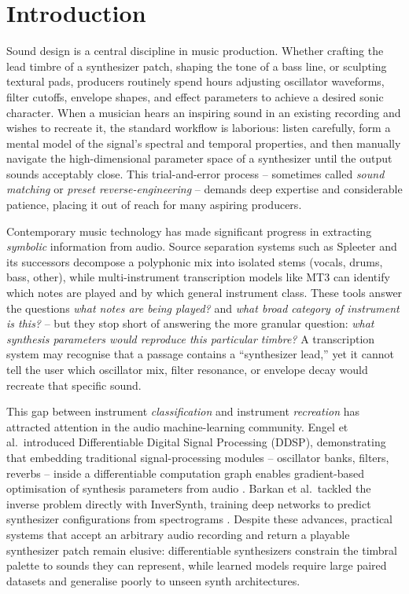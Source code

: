\section{Introduction}

Sound design is a central discipline in music production. Whether crafting the lead timbre of a synthesizer patch, shaping the tone of a bass line, or sculpting textural pads, producers routinely spend hours adjusting oscillator waveforms, filter cutoffs, envelope shapes, and effect parameters to achieve a desired sonic character. When a musician hears an inspiring sound in an existing recording and wishes to recreate it, the standard workflow is laborious: listen carefully, form a mental model of the signal's spectral and temporal properties, and then manually navigate the high-dimensional parameter space of a synthesizer until the output sounds acceptably close. This trial-and-error process -- sometimes called \emph{sound matching} or \emph{preset reverse-engineering} -- demands deep expertise and considerable patience, placing it out of reach for many aspiring producers.

Contemporary music technology has made significant progress in extracting \emph{symbolic} information from audio. Source separation systems such as Spleeter \citep{hennequin2020spleeter} and its successors decompose a polyphonic mix into isolated stems (vocals, drums, bass, other), while multi-instrument transcription models like MT3 \citep{gardner2022mt3} can identify which notes are played and by which general instrument class. These tools answer the questions \emph{what notes are being played?} and \emph{what broad category of instrument is this?} -- but they stop short of answering the more granular question: \emph{what synthesis parameters would reproduce this particular timbre?} A transcription system may recognise that a passage contains a ``synthesizer lead,'' yet it cannot tell the user which oscillator mix, filter resonance, or envelope decay would recreate that specific sound.

This gap between instrument \emph{classification} and instrument \emph{recreation} has attracted attention in the audio machine-learning community. Engel et al.\ introduced Differentiable Digital Signal Processing (DDSP), demonstrating that embedding traditional signal-processing modules -- oscillator banks, filters, reverbs -- inside a differentiable computation graph enables gradient-based optimisation of synthesis parameters from audio \citep{engel2020ddsp}. Barkan et al.\ tackled the inverse problem directly with InverSynth, training deep networks to predict synthesizer configurations from spectrograms \citep{barkan2019inversynth}. Despite these advances, practical systems that accept an arbitrary audio recording and return a playable synthesizer patch remain elusive: differentiable synthesizers constrain the timbral palette to sounds they can represent, while learned models require large paired datasets and generalise poorly to unseen synth architectures.

